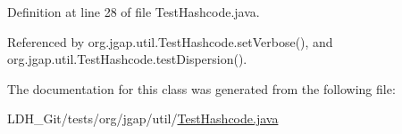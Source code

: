Definition at line 28 of file Test\-Hashcode.\-java.



Referenced by org.\-jgap.\-util.\-Test\-Hashcode.\-set\-Verbose(), and org.\-jgap.\-util.\-Test\-Hashcode.\-test\-Dispersion().



The documentation for this class was generated from the following file\-:\begin{DoxyCompactItemize}
\item 
L\-D\-H\-\_\-\-Git/tests/org/jgap/util/\hyperlink{_test_hashcode_8java}{Test\-Hashcode.\-java}\end{DoxyCompactItemize}
